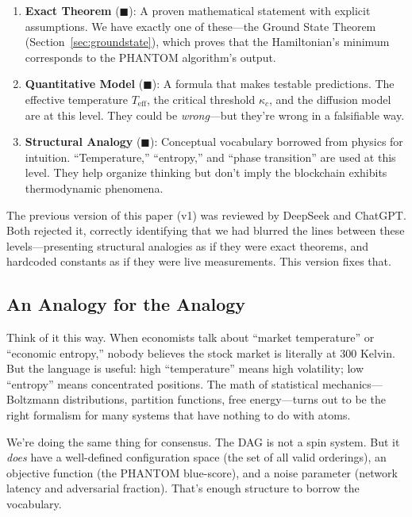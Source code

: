 \documentclass[11pt,a4paper]{article}
\begin{document}
\begin{susskindbox}
\begin{enumerate}
    \item \textbf{Exact Theorem} (\textcolor{measured}{$\blacksquare$}): A proven mathematical statement with explicit assumptions. We have exactly one of these---the Ground State Theorem (Section~\ref{sec:groundstate}), which proves that the Hamiltonian's minimum corresponds to the PHANTOM algorithm's output.

    \item \textbf{Quantitative Model} (\textcolor{hardcoded}{$\blacksquare$}): A formula that makes testable predictions. The effective temperature $T_{\text{eff}}$, the critical threshold $\kappa_c$, and the diffusion model are at this level. They could be \emph{wrong}---but they're wrong in a falsifiable way.

    \item \textbf{Structural Analogy} (\textcolor{theoretical}{$\blacksquare$}): Conceptual vocabulary borrowed from physics for intuition. ``Temperature,'' ``entropy,'' and ``phase transition'' are used at this level. They help organize thinking but don't imply the blockchain exhibits thermodynamic phenomena.
\end{enumerate}
\end{susskindbox}

The previous version of this paper (v1) was reviewed by DeepSeek and ChatGPT. Both rejected it, correctly identifying that we had blurred the lines between these levels---presenting structural analogies as if they were exact theorems, and hardcoded constants as if they were live measurements. This version fixes that.

\subsection{An Analogy for the Analogy}

Think of it this way. When economists talk about ``market temperature'' or ``economic entropy,'' nobody believes the stock market is literally at 300 Kelvin. But the language is useful: high ``temperature'' means high volatility; low ``entropy'' means concentrated positions. The math of statistical mechanics---Boltzmann distributions, partition functions, free energy---turns out to be the right formalism for many systems that have nothing to do with atoms.

We're doing the same thing for consensus. The DAG is not a spin system. But it \emph{does} have a well-defined configuration space (the set of all valid orderings), an objective function (the PHANTOM blue-score), and a noise parameter (network latency and adversarial fraction). That's enough structure to borrow the vocabulary.
\end{document}
